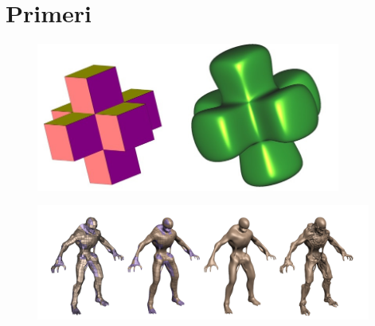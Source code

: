 \documentclass[a4paper,8pt]{beamer}
\begin{document}
\section{Primeri}
\begin{frame}
	\begin{figure}[h]
		\centering
		\includegraphics[width=10cm]{posebna_kocka.jpg}
	\end{figure}
\end{frame}

\begin{frame}
	\begin{figure}[h]
		\centering
		\includegraphics[width=11cm]{koncni_primer.png}
	\end{figure}
\end{frame}
\end{document}
